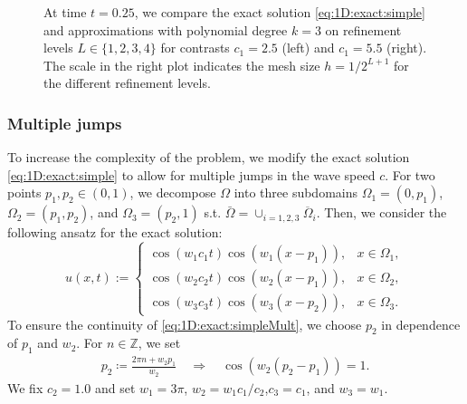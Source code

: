 \documentclass[sn-mathphys-num]{sn-jnl}
\numberwithin{equation}{section}
\begin{document}
\begin{figure}[!htbp]
\begin{center}
    \end{center}
    \caption{At time $t = 0.25$, we compare the exact solution \eqref{eq:1D:exact:simple} and approximations with polynomial degree $k = 3$ on refinement levels $L \in \{1,2,3,4 \}$ for contrasts $c_1 = 2.5$ (left) and $c_1= 5.5$ (right). The scale in the right plot indicates the mesh size $h = 1/2^{L+1}$ for the different refinement levels.}
    \label{fig:jumpCoefs:quality}
  \end{figure}


\subsubsection{Multiple jumps}
To increase the complexity of the problem, we modify the exact solution \eqref{eq:1D:exact:simple} to allow for multiple jumps in the wave speed $c$. For two points $p_1,p_2 \in (0,1)$, we decompose $\Omega$ into three subdomains $\Omega_1 = (0,p_1)$, $\Omega_2 = (p_1,p_2)$, and $\Omega_3 = (p_2,1)$ s.t. $\bar{\Omega} = \cup_{i = 1,2,3} \overline{\Omega}_i$. Then, we consider the following ansatz for the exact solution: 
\begin{equation}\label{eq:1D:exact:simpleMult}
    u(x,t) := \begin{cases}
        \cos(w_1 c_1 t) \cos(w_1(x-p_1)), & x \in \Omega_1, \\
        \cos(w_2 c_2 t) \cos(w_2(x-p_1)), & x \in \Omega_2, \\
        \cos(w_3 c_3 t) \cos(w_3(x-p_2)), & x \in \Omega_3. 
    \end{cases}
\end{equation}
To ensure the continuity of \eqref{eq:1D:exact:simpleMult}, we choose $p_2$ in dependence of $p_1$ and $w_2$. For $n \in \mathbb{Z}$, we set
\begin{align*}
    p_2 \coloneqq \frac{2 \pi n + w_2 p_1}{w_2} \quad \Longrightarrow \quad \cos(w_2(p_2-p_1)) = 1.
\end{align*}
We fix $c_2 = 1.0$ and set $w_1 = 3 \pi$, $w_2 = w_1 c_1/c_2$,$c_3 = c_1$, and $w_3 = w_1$. 
\end{document}
